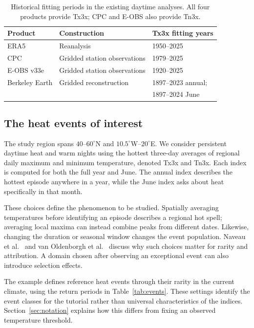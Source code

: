 \documentclass[11pt]{article}
\begin{document}
\begin{table}[htbp]
\centering
\caption{Historical fitting periods in the existing daytime analyses.
All four products provide Tx3x; CPC and E-OBS also provide Tn3x.}
\label{tab:data}
\begin{tabular}{l>{\raggedright\arraybackslash}p{4.4cm}l}\toprule
Product & Construction & Tx3x fitting years\\\midrule
ERA5 & Reanalysis & 1950--2025\\
CPC & Gridded station observations & 1979--2025\\
E-OBS v33e & Gridded station observations & 1920--2025\\
Berkeley Earth & Gridded reconstruction & 1897--2023 annual;\\
 & & 1897--2024 June\\\bottomrule
\end{tabular}
\end{table}

\subsection{The heat events of interest}
The study region spans $40$--$60^{\circ}$N and
$10.5^{\circ}$W--$20^{\circ}$E. We consider persistent daytime heat
and
warm nights using the hottest three-day averages of regional daily
maximum and minimum temperature, denoted Tx3x and Tn3x. Each index is
computed for both the full year and June. The annual index describes
the hottest episode anywhere in a year, while the June index asks
about
heat specifically in that month.

These choices define the phenomenon to be studied. Spatially averaging
temperatures before identifying an episode describes a regional hot
spell; averaging local maxima can instead combine peaks from different
dates. Likewise, changing the duration or seasonal window changes the
event population. Naveau et al.\ \cite{naveau2020statistical} and van
Oldenborgh et al.\ \cite{van2021pathways} discuss why such choices
matter
for rarity and attribution. A domain chosen after observing an
exceptional event can also introduce selection effects.

The example defines reference heat events through their rarity in the
current climate, using the return periods in Table~\ref{tab:events}.
These settings identify the event classes for the tutorial rather than
universal characteristics of the indices. Section~\ref{sec:notation}
explains how this differs from fixing an observed temperature
threshold.
\end{document}
